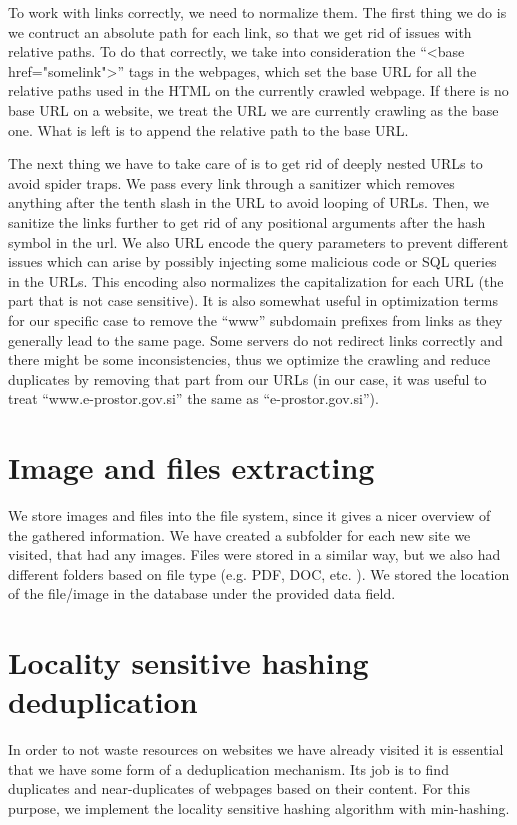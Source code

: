 \documentclass[9pt]{IEEEtran}
\begin{document}
To work with links correctly, we need to normalize them.
The first thing we do is we contruct an absolute path for each link, so that we get rid of issues with relative paths.
To do that correctly, we take into consideration the ``<base href="somelink">'' tags in the webpages, which set the base URL for all the relative paths used in the HTML on the currently crawled webpage.
If there is no base URL on a website, we treat the URL we are currently crawling as the base one.
What is left is to append the relative path to the base URL.

The next thing we have to take care of is to get rid of deeply nested URLs to avoid spider traps.
We pass every link through a sanitizer which removes anything after the tenth slash in the URL to avoid looping of URLs.
Then, we sanitize the links further to get rid of any positional arguments after the hash symbol in the url.
We also URL encode the query parameters to prevent different issues which can arise by possibly injecting some malicious code or SQL queries in the URLs.
This encoding also normalizes the capitalization for each URL (the part that is not case sensitive). It is also somewhat useful in optimization terms for our specific case to remove the ``www'' subdomain prefixes from links as they generally lead to the same page. Some servers do not redirect links correctly and there might be some inconsistencies, thus we optimize the crawling and reduce duplicates by removing that part from our URLs (in our case, it was useful to treat ``www.e-prostor.gov.si'' the same as ``e-prostor.gov.si'').

\section{Image and files extracting}\label{sec:imgFiles}
We store images and files into the file system, since it gives a nicer overview of the gathered information. 
We have created a subfolder for each new site we visited, that had any images.
Files were stored in a similar way, but we also had different folders based on file type (e.g. PDF, DOC, etc. ).
We stored the location of the file/image in the database under the provided data field.

\section{Locality sensitive hashing deduplication}\label{sec:lsh}

In order to not waste resources on websites we have already visited it is essential that we have some form of a deduplication mechanism.
Its job is to find duplicates and near-duplicates of webpages based on their content.
For this purpose, we implement the locality sensitive hashing algorithm \cite{Gionis1999} with min-hashing.
\end{document}
